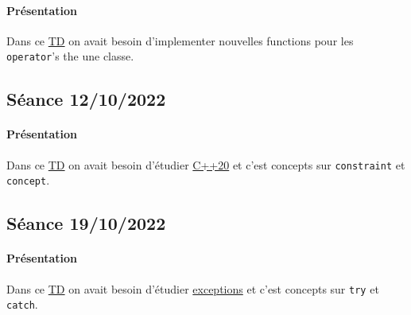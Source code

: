 \documentclass{article}
\begin{document}
\paragraph{Présentation}Dans ce \href{https://perso.ensta-paris.fr/~bmonsuez/Cours/doku.php?id=in204:seances:seance5}{TD} on avait besoin d'implementer nouvelles functions pour les \texttt{operator}'s the une classe.
\begin{scriptsize}\mycode
    
\end{scriptsize}
\begin{scriptsize}\mycode
    
\end{scriptsize}

\newpage\subsection{Séance 12/10/2022}
\paragraph{Présentation}Dans ce \href{https://perso.ensta-paris.fr/~bmonsuez/Cours/doku.php?id=in204:seances:seance6}{TD} on avait besoin d'étudier \href{https://isocpp.org/blog/2021/11/cpp-20-concepts}{C++20} et c'est concepts sur \texttt{constraint} et \texttt{concept}.
\begin{scriptsize}\mycode
    
\end{scriptsize}

\newpage\subsection{Séance 19/10/2022}
\paragraph{Présentation}Dans ce \href{https://perso.ensta-paris.fr/~bmonsuez/Cours/doku.php?id=in204:seances:seance7}{TD} on avait besoin d'étudier \href{https://www.youtube.com/watch?v=kjEhqgmEiWY}{exceptions} et c'est concepts sur \texttt{try} et \texttt{catch}.
\begin{scriptsize}\mycode
    
\end{scriptsize}
\end{document}
